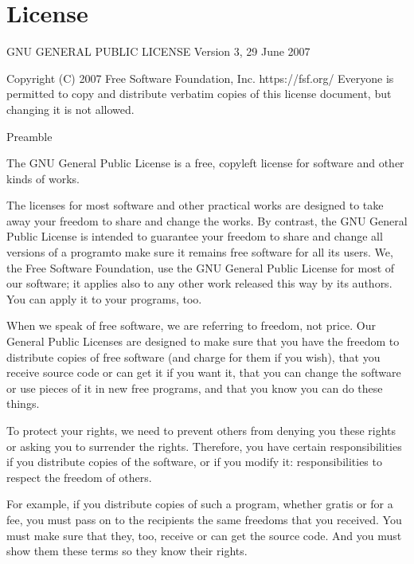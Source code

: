 \documentclass[a4paper,10pt,english]{sphinxmanual}
\begin{document}
\section{License}
\label{\detokenize{getting_started/introduction:license}}
\begin{sphinxVerbatim}[commandchars=\\\{\}]
                    GNU GENERAL PUBLIC LICENSE
                       Version 3, 29 June 2007

 Copyright (C) 2007 Free Software Foundation, Inc. \PYGZlt{}https://fsf.org/\PYGZgt{}
 Everyone is permitted to copy and distribute verbatim copies
 of this license document, but changing it is not allowed.

                            Preamble

  The GNU General Public License is a free, copyleft license for
software and other kinds of works.

  The licenses for most software and other practical works are designed
to take away your freedom to share and change the works.  By contrast,
the GNU General Public License is intended to guarantee your freedom to
share and change all versions of a program\PYGZhy{}\PYGZhy{}to make sure it remains free
software for all its users.  We, the Free Software Foundation, use the
GNU General Public License for most of our software; it applies also to
any other work released this way by its authors.  You can apply it to
your programs, too.

  When we speak of free software, we are referring to freedom, not
price.  Our General Public Licenses are designed to make sure that you
have the freedom to distribute copies of free software (and charge for
them if you wish), that you receive source code or can get it if you
want it, that you can change the software or use pieces of it in new
free programs, and that you know you can do these things.

  To protect your rights, we need to prevent others from denying you
these rights or asking you to surrender the rights.  Therefore, you have
certain responsibilities if you distribute copies of the software, or if
you modify it: responsibilities to respect the freedom of others.

  For example, if you distribute copies of such a program, whether
gratis or for a fee, you must pass on to the recipients the same
freedoms that you received.  You must make sure that they, too, receive
or can get the source code.  And you must show them these terms so they
know their rights.


\end{sphinxVerbatim}
\end{document}
